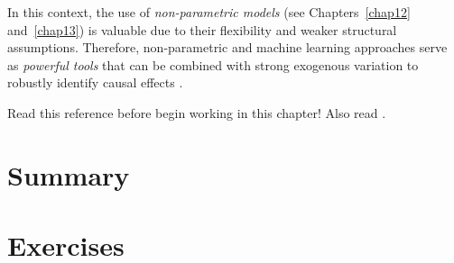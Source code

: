 In this context, the use of \textit{non-parametric models} (see Chapters~\ref{chap12} and~\ref{chap13}) is valuable due to their flexibility and weaker structural assumptions. Therefore, non-parametric and machine learning approaches serve as \textit{powerful tools} that can be combined with strong exogenous variation to robustly identify causal effects \cite{chernozhukov2018double,chernozhukov2024applied}.

Read this reference \cite{iacovone2023bayesian} before begin working in this chapter! Also read \cite{imbens1997bayesian}.



\section{Summary}

\section{Exercises}

